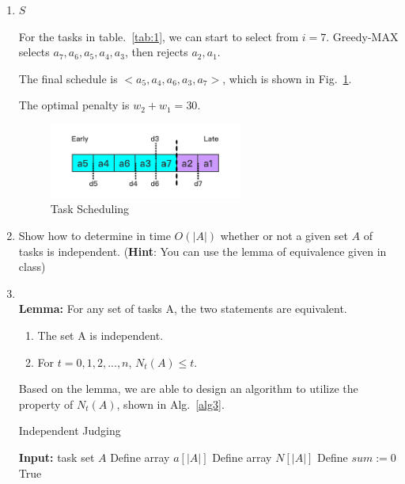 \documentclass[12pt,a4paper]{article}
\makeatletter
\newtheorem*{solution}{Solution}
\theoremstyle{definition}
\renewenvironment{solution}[1][Solution] {\par\pushQED{\qed}\normalfont\topsep6\p@\@plus6\p@\relax\trivlist\item[\hskip\labelsep\bfseries#1\@addpunct{.}]\ignorespaces}{\popQED\endtrivlist\@endpefalse} \makeatother
\makeatother
\begin{document}
\begin{enumerate}
\begin{enumerate}
\begin{solution}
\begin{algorithm}[H]
		\Return $S$\;	
	\end{algorithm}
	
For the tasks in table.~\ref{tab:1}, we can start to select from $i=7$. Greedy-MAX selects $a_7, a_6, a_5,a_4,a_3$, then rejects $a_2, a_1$.

The final schedule is $<a_5, a_4, a_6,a_3,a_7>$, which is shown in Fig.~\ref{task}.

The optimal penalty is $w_2 + w_1 = 30$.


\begin{figure}[htbp]
    \centering
    \includegraphics[width=0.6\textwidth]{explain1.png}
    \caption{Task Scheduling}\label{task}
\end{figure}


	    \end{solution}
        \item Show how to determine in time $O(|A|)$ whether or not a given set $A$ of tasks is independent. (\textbf{Hint}: You can use the lemma of equivalence given in class)
 	       \begin{solution}
	       ~\\
	      \textbf{Lemma:} For any set of tasks A, the two statements are equivalent.
	      \begin{enumerate}
	      \item The set A is independent.
	      \item For $t=0,1,2,...,n$, $N_t(A)\leq t$.
	   \end{enumerate}
	   
	  Based on the lemma, we are able to design an algorithm to utilize the property of $N_t(A)$, shown in Alg.~\ref{alg3}.
		
		\begin{algorithm}[H]
   \caption{Independent Judging}\label{alg3}
		\textbf{Input:} task set $A$ \;
		Define array $a[|A|]$\;
		Define array $N[|A|]$\;
		Define $sum:=0$\;
		\Return True		
	\end{algorithm}



\end{solution}
\end{enumerate}
\end{enumerate}
\end{document}
